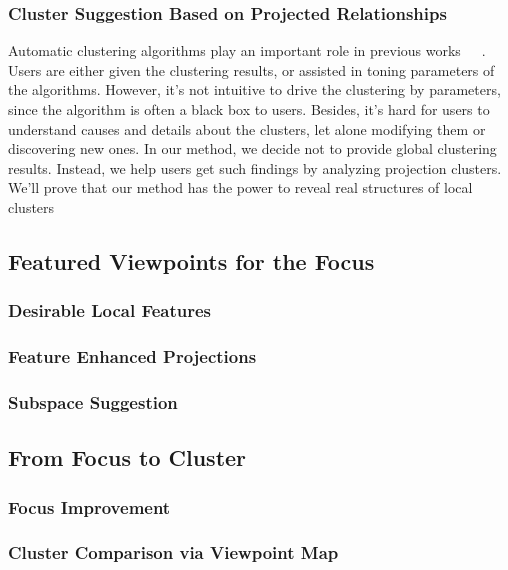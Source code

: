 \subsubsection{Cluster Suggestion Based on Projected Relationships}
Automatic clustering algorithms play an important role in previous works~\cite{DBLP:conf/ieeevast/NamHMZI07}~\cite{DBLP:journals/cgf/LeeKCSP12}~\cite{DBLP:journals/cgf/LiuWTBP15}. Users are either given the clustering results, or assisted in toning parameters of the algorithms. However, it's not intuitive to drive the clustering by parameters, since the algorithm is often a black box to users. Besides, it's hard for users to understand causes and details about the clusters, let alone modifying them or discovering new ones. In our method, we decide not to provide global clustering results. Instead, we help users get such findings by analyzing projection clusters. We'll prove that our method has the power to reveal real structures of local clusters

\subsection{Featured Viewpoints for the Focus}

\subsubsection{Desirable Local Features}
\subsubsection{Feature Enhanced Projections}
\subsubsection{Subspace Suggestion}
\subsection{From Focus to Cluster}
\subsubsection{Focus Improvement}
\subsubsection{Cluster Comparison via Viewpoint Map}
